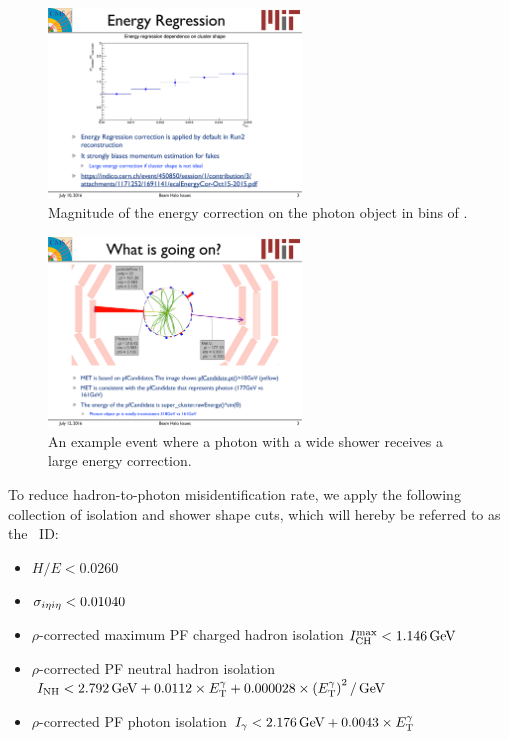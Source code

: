 \begin{figure}[htbp]
  \begin{center}
    \includegraphics[width=0.6\textwidth]{Reconstruction/Figures/corr_vs_sieie.pdf}
    \caption{
      Magnitude of the energy correction on the photon object in bins of \sieie.
    }
    \label{fig:corr_vs_sieie}
  \end{center}
\end{figure}

\begin{figure}[htbp]
  \begin{center}
    \includegraphics[width=0.6\textwidth]{Reconstruction/Figures/badcorr_evtdisp.pdf}
    \caption{
      An example event where a photon with a wide shower receives a large energy correction.
    }
    \label{fig:badcorr_evtdisp}
  \end{center}
\end{figure}

To reduce hadron-to-photon misidentification rate, we apply the following collection of isolation and shower shape cuts, which will hereby be referred to as the \egamma\ ID:
\begin{itemize}
  \item $H/E < 0.0260$
  \item $\sigma_{i\eta i\eta} < 0.01040$
  \item $\rho$-corrected maximum PF charged hadron isolation $I_{\text{CH}}^{\text{max}} < 1.146\,\text{Ge\hspace{-.08em}V}$
  \item $\rho$-corrected PF neutral hadron isolation $I_{\text{NH}} < 2.792\,\text{Ge\hspace{-.08em}V} + 0.0112 \times E_{\mathrm{T}}^{\gamma} + 0.000028 \times \left(E_{\mathrm{T}}^{\gamma} \right)^2/\,\text{Ge\hspace{-.08em}V}$
  \item $\rho$-corrected PF photon isolation $I_{\gamma} < 2.176\,\text{Ge\hspace{-.08em}V} + 0.0043 \times E_{\mathrm{T}}^{\gamma}$
\end{itemize}

